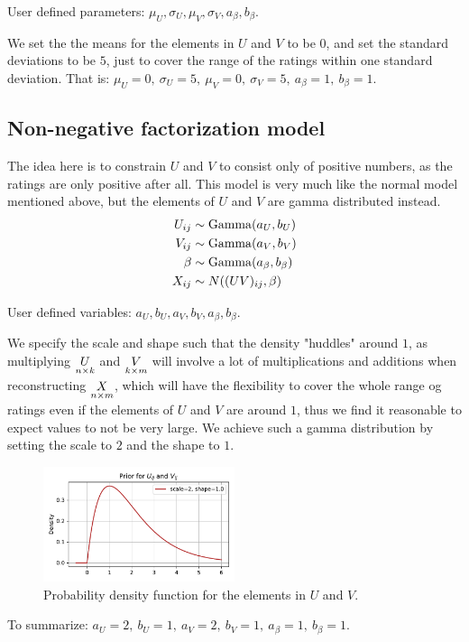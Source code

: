 \documentclass[12pt]{article}
\begin{document}
    User defined parameters: $\mu_U, \sigma_U, \mu_V, \sigma_V, a_\beta, b_\beta$.
    
    \vspace{3mm}
    We set the the means for the elements in $U$ and $V$ to be $0$, and set the standard deviations to be $5$, just to cover the range of the ratings within one standard deviation. That is: $\mu_U=0,\ \sigma_U=5,\ \mu_V=0,\ \sigma_V=5,\ a_\beta=1,\ b_\beta=1$.

    \subsection{Non-negative factorization model}
    The idea here is to constrain $U$ and $V$ to consist only of positive numbers, as the ratings are only positive after all. This model is very much like the normal model mentioned above, but the elements of $U$ and $V$ are gamma distributed instead.
    \begin{align*}
        U_{ij} &\sim \operatorname{Gamma}(a_U, b_U) \\
        V_{ij} &\sim \operatorname{Gamma}(a_V, b_V) \\
        \beta  &\sim \operatorname{Gamma}(a_\beta, b_\beta) \\
        X_{ij} &\sim N((UV)_{ij}, \beta) 
    \end{align*}

    User defined variables: $a_U, b_U, a_V, b_V, a_\beta, b_\beta$.
    
    \vspace{3mm}
    We specify the scale and shape such that the density "huddles" around $1$, as multiplying $\underset{n \times k}{U}$ and $\underset{k \times m}{V}$ will involve a lot of multiplications and additions when reconstructing $\underset{n \times m}{X}$, which will have the flexibility to cover the whole range og ratings even if the elements of $U$ and $V$ are around $1$, thus we find it reasonable to expect values to not be very large. We achieve such a gamma distribution by setting the scale to $2$ and the shape to $1$.
    \begin{figure}[H]
        \centering
        \includegraphics[width=0.5\textwidth]{nmfprior.pdf}
        \caption{Probability density function for the elements in $U$ and $V$.}
    \end{figure}
    To summarize: $a_U=2,\ b_U=1,\ a_V=2,\ b_V=1,\ a_\beta=1,\ b_\beta=1$.
\end{document}
